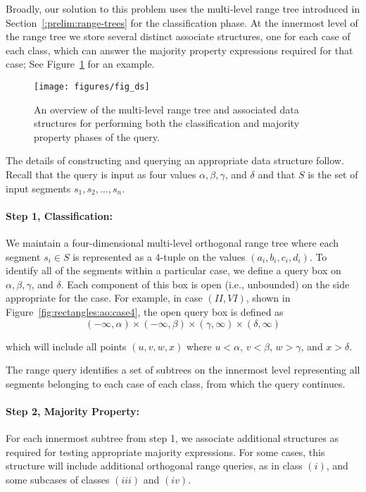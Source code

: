 Broadly, our solution to this problem uses the multi-level range tree introduced in Section~\ref{:prelim:range-trees} for the classification phase. At the innermost level of the range tree we store several distinct associate structures, one for each case of each class, which can answer the majority property expressions required for that case; See Figure~\ref{fig:rectangles:ao:overview} for an example.

\begin{figure}[t]
\begin{center}
  \texttt{[image: figures/fig\_ds]}
  \caption[An overview of the multi-level range tree required for arbitrarily-oriented segments.]{An overview of the multi-level range tree and associated data structures for performing both the classification and majority property phases of the query.}
  \label{fig:rectangles:ao:overview}
\end{center}
\end{figure}

The details of constructing and querying an appropriate data structure follow. Recall that the query is input as four values $\alpha, \beta, \gamma$, and $\delta$ and that $S$ is the set of input segments $s_1, s_2, \ldots, s_n$.

\paragraph{Step 1, Classification:} We maintain a four-dimensional multi-level orthogonal range tree where each segment $s_i \in S$ is represented as a 4-tuple on the values $(a_i, b_i, c_i, d_i)$. To identify all of the segments within a particular case, we define a query box on $\alpha, \beta, \gamma$, and $\delta$. Each component of this box is open (i.e., unbounded) on the side appropriate for the case. For example, in case $(II, VI)$, shown in Figure~\ref{fig:rectangles:ao:case4}, the open query box is defined as
\[
(-\infty, \alpha) \times (-\infty, \beta) \times (\gamma, \infty) \times (\delta, \infty)
\]

\noindent which will include all points $(u, v, w, x)$ where $u < \alpha$, $v < \beta$, $w > \gamma$, and $x > \delta$.

The range query identifies a set of subtrees on the innermost level representing all segments belonging to each case of each class, from which the query continues.

\paragraph{Step 2, Majority Property:} For each innermost subtree from step 1, we associate additional structures as required for testing appropriate majority expressions. For some cases, this structure will include additional orthogonal range queries, as in class $(i)$, and some subcases of classes $(iii)$ and $(iv)$.

